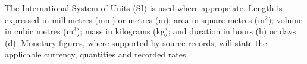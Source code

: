 ﻿
The International System of Units (SI) is used where appropriate. Length is expressed in millimetres (mm) or metres (m); area in square metres (m$^2$); volume in cubic metres (m$^3$); mass in kilograms (kg); and duration in hours (h) or days (d). Monetary figures, where supported by source records, will state the applicable currency, quantities and recorded rates.